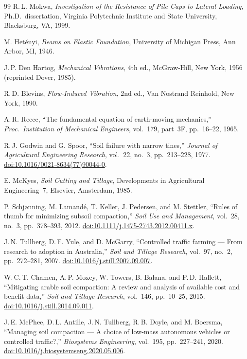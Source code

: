 \documentclass[11pt,a4paper]{article}
\begin{document}
\begin{thebibliography}{99}
R.\,L. Mokwa,
\emph{Investigation of the Resistance of Pile Caps to Lateral Loading},
Ph.D.\ dissertation, Virginia Polytechnic Institute and State University, Blacksburg, VA, 1999.

M. Het\'enyi,
\emph{Beams on Elastic Foundation},
University of Michigan Press, Ann Arbor, MI, 1946.

J.\,P. Den Hartog,
\emph{Mechanical Vibrations}, 4th ed.,
McGraw-Hill, New York, 1956 (reprinted Dover, 1985).

R.\,D. Blevins,
\emph{Flow-Induced Vibration}, 2nd ed.,
Van Nostrand Reinhold, New York, 1990.

A.\,R. Reece,
``The fundamental equation of earth-moving mechanics,''
\emph{Proc.\ Institution of Mechanical Engineers}, vol.~179, part~3F, pp.~16--22, 1965.

R.\,J. Godwin and G. Spoor,
``Soil failure with narrow tines,''
\emph{Journal of Agricultural Engineering Research}, vol.~22, no.~3, pp.~213--228, 1977.
\href{https://doi.org/10.1016/0021-8634(77)90044-0}{doi:10.1016/0021-8634(77)90044-0}.

E. McKyes,
\emph{Soil Cutting and Tillage}, Developments in Agricultural Engineering~7,
Elsevier, Amsterdam, 1985.


P. Schj\o nning, M. Lamand\'e, T. Keller, J. Pedersen, and M. Stettler,
``Rules of thumb for minimizing subsoil compaction,''
\emph{Soil Use and Management}, vol.~28, no.~3, pp.~378--393, 2012.
\href{https://doi.org/10.1111/j.1475-2743.2012.00411.x}{doi:10.1111/j.1475-2743.2012.00411.x}.

J.\,N. Tullberg, D.\,F. Yule, and D. McGarry,
``Controlled traffic farming --- From research to adoption in Australia,''
\emph{Soil and Tillage Research}, vol.~97, no.~2, pp.~272--281, 2007.
\href{https://doi.org/10.1016/j.still.2007.09.007}{doi:10.1016/j.still.2007.09.007}.

W.\,C.\,T. Chamen, A.\,P. Moxey, W. Towers, B. Balana, and P.\,D. Hallett,
``Mitigating arable soil compaction: A review and analysis of available cost and benefit data,''
\emph{Soil and Tillage Research}, vol.~146, pp.~10--25, 2015.
\href{https://doi.org/10.1016/j.still.2014.09.011}{doi:10.1016/j.still.2014.09.011}.

J.\,E. McPhee, D.\,L. Antille, J.\,N. Tullberg, R.\,B. Doyle, and M. Boersma,
``Managing soil compaction --- A choice of low-mass autonomous vehicles or controlled traffic?,''
\emph{Biosystems Engineering}, vol.~195, pp.~227--241, 2020.
\href{https://doi.org/10.1016/j.biosystemseng.2020.05.006}{doi:10.1016/j.biosystemseng.2020.05.006}.


\end{thebibliography}
\end{document}
